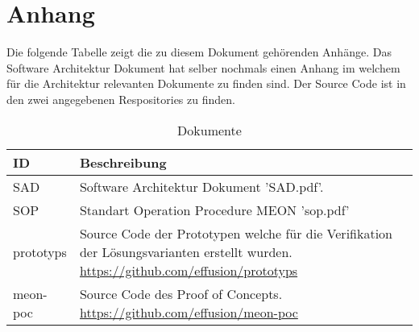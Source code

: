 \chapter{Anhang}
\label{documents}

Die folgende Tabelle zeigt die zu diesem Dokument gehörenden Anhänge. Das Software Architektur Dokument hat selber nochmals einen Anhang im welchem für die Architektur relevanten Dokumente zu finden sind. Der Source Code ist in den zwei angegebenen Respositories zu finden.

\begin{table}[H]
	\centering
	\caption{Dokumente}
	\begin{tabular}{ | p{2cm} | p{13cm} | }
		\toprule
		{\textbf{ID}} & {\textbf{Beschreibung}} \\
		\midrule
		SAD &  Software Architektur Dokument 'SAD.pdf'.\\ \hline
		SOP &  Standart Operation Procedure MEON 'sop.pdf'\\ \hline
		prototyps & Source Code der Prototypen welche für die Verifikation der Lösungsvarianten erstellt wurden. \url{https://github.com/effusion/prototyps} \\ \hline
		meon-poc &  Source Code des Proof of Concepts. \url{https://github.com/effusion/meon-poc}\\	
		\bottomrule
	\end{tabular}
\end{table}